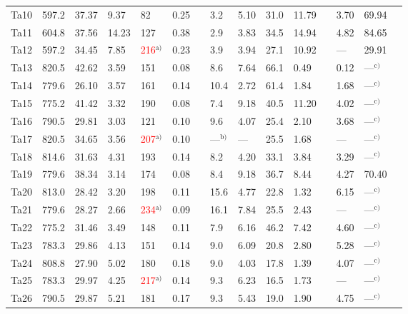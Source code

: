 \documentclass[12pt,onecolumn]{article}
\begin{document}
\begin{landscape}
\begin{table}
{\begin{threeparttable}
\begin{tabular}{rllllllllllllll}
Ta10 & 597.2 & 37.37 & 9.37 &   82 & 0.25 &  &  3.2 & 5.10 & 31.0 & 11.79 &  & 3.70 &69.94 \\ 
Ta11 & 604.8 & 37.56 & 14.23 &  127 & 0.38 &  &  2.9 & 3.83 & 34.5 & 14.94 &  & 4.82 &84.65 \\ 
Ta12 & 597.2 & 34.45 & 7.85 &  \textcolor{red}{216}$^\text{a)}$ & 0.23 &  &  3.9 & 3.94 & 27.1 & 10.92 &  & --- &29.91 \\ 
Ta13 & 820.5 & 42.62 & 3.59 &  151 & 0.08 &  &  8.6 & 7.64 & 66.1 & 0.49 &  & 0.12 &---$^\text{c)}$\\ 
Ta14 & 779.6 & 26.10 & 3.57 &  161 & 0.14 &  & 10.4 & 2.72 & 61.4 & 1.84 &  & 1.68 &---$^\text{c)}$\\ 
Ta15 & 775.2 & 41.42 & 3.32 &  190 & 0.08 &  &  7.4 & 9.18 & 40.5 & 11.20 &  & 4.02 &---$^\text{c)}$\\ 
Ta16 & 790.5 & 29.81 & 3.03 &  121 & 0.10 &  &  9.6 & 4.07 & 25.4 & 2.10 &  & 3.68 &---$^\text{c)}$\\ 
Ta17 & 820.5 & 34.65 & 3.56 &  \textcolor{red}{207}$^\text{a)}$ & 0.10 &  & ---$^\text{b)}$ & --- &25.5 & 1.68 &  & --- &---$^\text{c)}$\\ 
Ta18 & 814.6 & 31.63 & 4.31 &  193 & 0.14 &  &  8.2 & 4.20 & 33.1 & 3.84 &  & 3.29 &---$^\text{c)}$\\ 
Ta19 & 779.6 & 38.34 & 3.14 &  174 & 0.08 &  &  8.4 & 9.18 & 36.7 & 8.44 &  & 4.27 &70.40 \\ 
Ta20 & 813.0 & 28.42 & 3.20 &  198 & 0.11 &  & 15.6 & 4.77 & 22.8 & 1.32 &  & 6.15 &---$^\text{c)}$\\ 
Ta21 & 779.6 & 28.27 & 2.66 &  \textcolor{red}{234}$^\text{a)}$ & 0.09 &  & 16.1 & 7.84 & 25.5 & 2.43 &  & --- &---$^\text{c)}$\\
Ta22 & 775.2 & 31.46 & 3.49 &  148 & 0.11 &  &  7.9 & 6.16 & 46.2 & 7.42 &  & 4.60 &---$^\text{c)}$\\ 
Ta23 & 783.3 & 29.86 & 4.13 &  151 & 0.14 &  &  9.0 & 6.09 & 20.8 & 2.80 &  & 5.28 &---$^\text{c)}$\\ 
Ta24 & 808.8 & 27.90 & 5.02 &  180 & 0.18 &  &  9.0 & 4.03 & 17.8 & 1.39 &  & 4.07 &---$^\text{c)}$\\ 
Ta25 & 783.3 & 29.97 & 4.25 &  \textcolor{red}{217}$^\text{a)}$ & 0.14 &  &  9.3 & 6.23 & 16.5 & 1.73 &  & --- &---$^\text{c)}$\\
Ta26 & 790.5 & 29.87 & 5.21 &  181 & 0.17 &  &  9.3 & 5.43 & 19.0 & 1.90 &  & 4.75 &---$^\text{c)}$\\ 
\bottomrule
\end{tabular}
\begin{tablenotes}

\end{tablenotes}
\end{threeparttable}}
\end{table}
\end{landscape}
\end{document}
